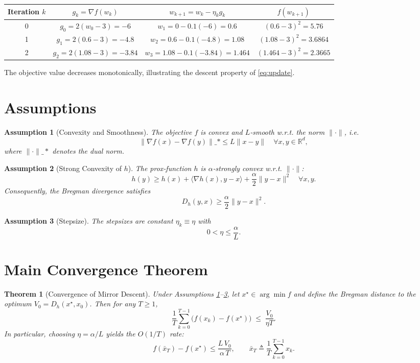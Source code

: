 \documentclass{article}
\newtheorem{theorem}{Theorem}
\newtheorem{assumption}{Assumption}
\newcommand{\grad}{\nabla}
\newcommand{\R}{\mathbb{R}}
\begin{document}
\begin{center}
\begin{tabular}{c|c|c|c}
Iteration $k$ & $g_{k}= \grad f(w_{k})$ & $w_{k+1}= w_{k}-\eta_{k} g_{k}$ & $f(w_{k+1})$\\\hline
0 & $g_{0}=2(w_{0}-3)=-6$ & $w_{1}=0-0.1(-6)=0.6$ & $(0.6-3)^{2}=5.76$\\
1 & $g_{1}=2(0.6-3)=-4.8$ & $w_{2}=0.6-0.1(-4.8)=1.08$ & $(1.08-3)^{2}=3.6864$\\
2 & $g_{2}=2(1.08-3)=-3.84$ & $w_{3}=1.08-0.1(-3.84)=1.464$ & $(1.464-3)^{2}=2.3665$
\end{tabular}
\end{center}
The objective value decreases monotonically, illustrating the descent property of \eqref{eq:update}.

\newpage
\section*{Assumptions}
\begin{assumption}[Convexity and Smoothness]\label{ass:convex}
The objective $f$ is convex and $L$‑smooth w.r.t. the norm $\|\cdot\|$, i.e.
\[
\|\grad f(x)-\grad f(y)\|\_{*}\le L\|x-y\|\quad\forall x,y\in\R^{d},
\]
where $\|\cdot\|\_{*}$ denotes the dual norm.
\end{assumption}

\begin{assumption}[Strong Convexity of $h$]\label{ass:hstrong}
The prox‑function $h$ is $\alpha$‑strongly convex w.r.t. $\|\cdot\|$:
\[
h(y)\ge h(x)+\langle\nabla h(x),y-x\rangle+\frac{\alpha}{2}\|y-x\|^{2}\quad\forall x,y.
\]
Consequently, the Bregman divergence satisfies
\[
D_{h}(y,x)\ge\frac{\alpha}{2}\|y-x\|^{2}.
\tag{2}
\]
\end{assumption}

\begin{assumption}[Stepsize]\label{ass:stepsize}
The stepsizes are constant $\eta_{k}\equiv\eta$ with
\[
0<\eta\le \frac{\alpha}{L}.
\]
\end{assumption}

\section*{Main Convergence Theorem}
\begin{theorem}[Convergence of Mirror Descent]\label{thm:md}
Under Assumptions \ref{ass:convex}–\ref{ass:stepsize}, let $x^{\star}\in\arg\min f$ and define the Bregman distance to the optimum $V_{0}=D_{h}(x^{\star},x_{0})$. Then for any $T\ge1$,
\[
\frac{1}{T}\sum_{k=0}^{T-1}\bigl(f(x_{k})-f(x^{\star})\bigr)
\;\le\;
\frac{V_{0}}{\eta T}.
\tag{3}
\]
In particular, choosing $\eta=\alpha/L$ yields the $O(1/T)$ rate:
\[
f(\bar{x}_{T})-f(x^{\star})\le \frac{L\,V_{0}}{\alpha\,T},
\qquad 
\bar{x}_{T}\triangleq\frac{1}{T}\sum_{k=0}^{T-1}x_{k}.
\]
\end{theorem}
\end{document}
